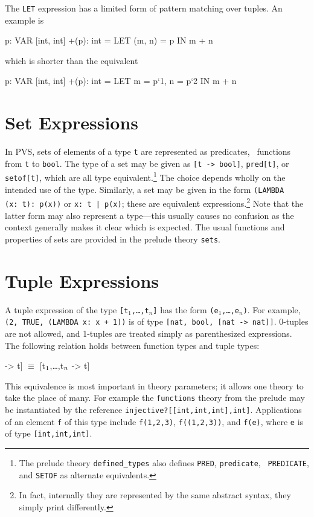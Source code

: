 The \texttt{LET} expression has a limited form of pattern matching over
tuples.  An example is
\begin{pvsex}
  p: VAR [int, int]
  +(p): int = LET (m, n) = p IN m + n
\end{pvsex}
which is shorter than the equivalent
\begin{pvsex}
  p: VAR [int, int]
  +(p): int = LET m = p`1, n = p`2 IN m + n
\end{pvsex}


\section{Set Expressions}\label{set-exprs}

In PVS, sets of elements of a type \texttt{t} are represented as
predicates, \ie\ functions from \texttt{t} to \texttt{bool}.  The type of a
set may be given as \texttt{[t -> bool]}, \texttt{pred[t]}, or \texttt{
setof[t]}, which are all type equivalent.\footnote{The prelude theory
\texttt{defined\_types} also defines \texttt{PRED}, \texttt{predicate}, \texttt{
PREDICATE}, and \texttt{SETOF} as alternate equivalents.}
The choice depends wholly on the intended use of the type.
Similarly, a set may be given in the form \texttt{(LAMBDA (x:\ t):\
p(x))} or \texttt{\setb{}x:\ t | p(x)\sete}; these are equivalent
expressions.\footnote{In fact, internally they are represented by the
same abstract syntax, they simply print differently.} Note that the
latter form may also represent a type---this usually causes no
confusion as the context generally makes it clear which is expected.
The usual functions and properties of sets are provided in the prelude
theory \texttt{sets}.


\section{Tuple Expressions}\label{tuple-exprs}

A tuple expression of the type \texttt{[t$_1$,\ldots,t$_n$]} has the form
\texttt{(e$_1$,\ldots,e$_n$)}.  For example, \texttt{(2, TRUE, (LAMBDA x:\ x +
1))} is of type \texttt{[nat, bool, [nat -> nat]]}.  0-tuples are not
allowed, and 1-tuples are treated simply as parenthesized expressions.
The following relation holds between function types and tuple types:
\begin{pvsex}
  [[t\(\sb{1}\),\ldots,t\(\sb{n}\)] -> t] \(\equiv\) [t\(\sb{1}\),\ldots,t\(\sb{n}\) -> t]
\end{pvsex}
%
This equivalence is most important in theory parameters; it allows one
theory to take the place of many.  For example the \texttt{functions}
theory from the prelude may be instantiated by the reference
\texttt{injective?[[int,int,int],int]}.  Applications of an element \texttt{f} of
this type include \texttt{f(1,2,3)}, \texttt{f((1,2,3))}, and \texttt{f(e)},
where \texttt{e} is of type \texttt{[int,int,int]}.

